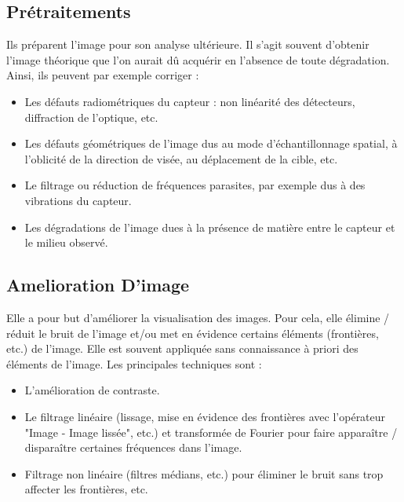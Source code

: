 \documentclass[11pt]{report}
\begin{document}
\subsection{Prétraitements}

Ils préparent l'image pour son analyse ultérieure. Il s'agit souvent d'obtenir l'image
théorique que l'on aurait dû acquérir en l'absence de toute dégradation. Ainsi, ils peuvent
par exemple corriger :
\begin{itemize}
\item Les défauts radiométriques du capteur : non linéarité des détecteurs, diffraction de
l'optique, etc.
\item
Les défauts géométriques de l'image dus au mode d'échantillonnage spatial, à
l'oblicité de la direction de visée, au déplacement de la cible, etc.
\item
Le filtrage ou réduction de fréquences parasites, par exemple dus à des vibrations du
capteur.
\item Les dégradations de l'image dues à la présence de matière entre le capteur et le
milieu observé.
\end{itemize}
\subsection{Amelioration D'image}
Elle a pour but d'améliorer la visualisation des images. Pour cela, elle élimine / réduit
le bruit de l’image et/ou met en évidence certains éléments (frontières, etc.) de l'image. Elle
est souvent appliquée sans connaissance à priori des éléments de l'image. Les principales
techniques sont :
\begin{itemize}
\item L'amélioration de contraste.
\item Le filtrage linéaire (lissage, mise en évidence des frontières avec l'opérateur "Image -
Image lissée", etc.) et transformée de Fourier pour faire apparaître / disparaître
certaines fréquences dans l'image.
\item
Filtrage non linéaire (filtres médians, etc.) pour éliminer le bruit sans trop affecter les
frontières, etc.

\end{itemize}
\end{document}
